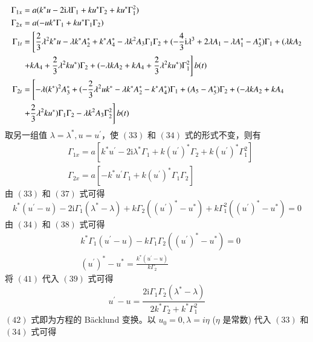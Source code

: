 \begin{align}
  \Gamma_{1x} &= a(k^{*}u - 2\mathrm{i}\lambda \Gamma_{1} + ku^{*}\Gamma_{2} + ku^{*}\Gamma_{1}^{2}) \\
  \Gamma_{2x} &= a(-uk^{*}\Gamma_{1} + ku^{*}\Gamma_{1}\Gamma_{2}) \\
  \Gamma_{1t} &= \left[\frac{2}{3}\lambda^{2}k^{*}u - \lambda k^{*}A_{2}^{*} + k^{*}A_{4}^{*} - \lambda k^{2}A_{3}\Gamma_{1}\Gamma_{2} + (-\frac{4}{3}\mathrm{i}\lambda^{3} + 2\lambda A_{1} - \lambda A_{1}^{*} - A_{5}^{*})\Gamma_{1} + (\lambda kA_{2} \right. \notag\\
  & \left. + kA_{4} + \frac{2}{3}\lambda^{2}ku^{*})\Gamma_{2} + (-\lambda kA_{2} + kA_{4} + \frac{2}{3}\lambda^{2}ku^{*})\Gamma_{1}^{2}\right] b(t) \\
  \Gamma_{2t} &= \left[ -\lambda(k^{*})^{2}A_{3}^{*} + (-\frac{2}{3}\lambda^{2}uk^{*} - \lambda k^{*}A_{2}^{*} - k^{*}A_{4}^{*})\Gamma_{1} + (A_{5}-A_{5}^{*})\Gamma_{2} + (-\lambda kA_{2} +kA_{4} \right. \notag\\
  & \left. + \frac{2}{3}\lambda^{2}ku^{*})\Gamma_{1}\Gamma_{2} - \lambda k^{2}A_{3}\Gamma_{2}^{2} \right] b(t)
\end{align}
取另一组值 $\lambda = \lambda^{*}, u = u^{'}$，使 $(33)$ 和 $(34)$ 式的形式不变，则有
\begin{align}
  & \Gamma_{1x} = a\left[k^{*}u^{'} - 2\mathrm{i}\lambda^{*}\Gamma_{1} + k(u^{'})^{*}\Gamma_{2} + k(u^{'})^{*}\Gamma_{1}^{2}\right] \\
  & \Gamma_{2x} = a\left[-k^{*}u^{'}\Gamma_{1} + k(u^{'})^{*}\Gamma_{1}\Gamma_{2}\right]
\end{align}
由 $(33)$ 和 $(37)$ 式可得
\begin{equation}
  k^{*}(u^{'}-u) - 2\mathrm{i}\Gamma_{1}(\lambda^{*}-\lambda) + k\Gamma_{2}((u^{'})^{*}-u^{*}) + k\Gamma_{1}^{2}((u^{'})^{*}-u^{*}) = 0
\end{equation}
由 $(34)$ 和 $(38)$ 式可得
\begin{align}
  & k^{*}\Gamma_{1}(u^{'}-u) - k\Gamma_{1}\Gamma_{2}((u^{'})^{*}-u^{*}) = 0 \\
  & (u^{'})^{*} - u^{*} = \frac{k^{*}(u^{'}-u)}{k\Gamma_{2}}
\end{align}
将 $(41)$ 代入 $(39)$ 式可得
\begin{equation}
  u^{'} - u = \frac{2\mathrm{i}\Gamma_{1}\Gamma_{2}(\lambda^{*}-\lambda)}{2k^{*}\Gamma_{2} + k^{*}\Gamma_{1}^{2}}
\end{equation}
$(42)$ 式即为方程的 B\"acklund 变换。以 $u_{0} = 0, \lambda = i\eta$ ($\eta$ 是常数) 代入 $(33)$ 和 $(34)$ 式可得
